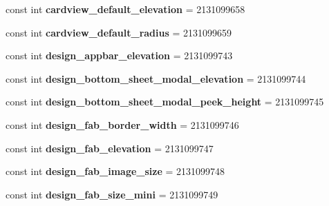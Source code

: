\begin{DoxyCompactItemize}
const int {\bfseries cardview\+\_\+default\+\_\+elevation} = 2131099658
\item 
\mbox{\label{classXaria_1_1Resource_1_1Dimension_a05f94d23c3eb52b298ac506cb7d9f093}} 
const int {\bfseries cardview\+\_\+default\+\_\+radius} = 2131099659
\item 
\mbox{\label{classXaria_1_1Resource_1_1Dimension_a2f3019552069441d9294c2bf6182eb8c}} 
const int {\bfseries design\+\_\+appbar\+\_\+elevation} = 2131099743
\item 
\mbox{\label{classXaria_1_1Resource_1_1Dimension_aa83a5c9b4ba7fe4882cf9a01b673a5a1}} 
const int {\bfseries design\+\_\+bottom\+\_\+sheet\+\_\+modal\+\_\+elevation} = 2131099744
\item 
\mbox{\label{classXaria_1_1Resource_1_1Dimension_a626438101302e4a41b176c8fcd7b0e2b}} 
const int {\bfseries design\+\_\+bottom\+\_\+sheet\+\_\+modal\+\_\+peek\+\_\+height} = 2131099745
\item 
\mbox{\label{classXaria_1_1Resource_1_1Dimension_a0fe4e3700d08487251852619782976f0}} 
const int {\bfseries design\+\_\+fab\+\_\+border\+\_\+width} = 2131099746
\item 
\mbox{\label{classXaria_1_1Resource_1_1Dimension_aef18c5171a66d92170d4620b624f6127}} 
const int {\bfseries design\+\_\+fab\+\_\+elevation} = 2131099747
\item 
\mbox{\label{classXaria_1_1Resource_1_1Dimension_a1dc4cce538d6379e7c33386027732cef}} 
const int {\bfseries design\+\_\+fab\+\_\+image\+\_\+size} = 2131099748
\item 
\mbox{\label{classXaria_1_1Resource_1_1Dimension_a9337386d8d73384dea3e606566b43408}} 
const int {\bfseries design\+\_\+fab\+\_\+size\+\_\+mini} = 2131099749
\item 
\mbox{\label{classXaria_1_1Resource_1_1Dimension_a5c1240508e7d75637a9b4b79c11e6fc9}} 

\end{DoxyCompactItemize}
